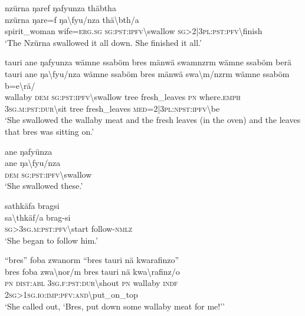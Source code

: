 \ea\label{ex:8:a1753}
nzürna ŋaref ŋafyunza thäbtha\\
\gll nzürna	ŋare=f	ŋa{\textbackslash}fyu/nza	thä{\textbackslash}bth/a\\
     spirit\_woman	wife=\textsc{erg}.\textsc{sg}	\textsc{sg}:\textsc{pst}:\textsc{ipfv}{\textbackslash}swallow	\textsc{sg}>2|3\textsc{pl}:\textsc{pst}:\textsc{pfv}{\textbackslash}finish\\
\glt `The Nzürna swallowed it all down. She finished it all.'
\z

\ea\label{ex:8:a1755}
tauri ane ŋafyunza wämne ssaböm bres mänwä swamnzrm wämne ssaböm berä\\
\gll tauri	ane	ŋa{\textbackslash}fyu/nza	wämne	ssaböm	bres	mänwä	swa{\textbackslash}m/nzrm	wämne	ssaböm	b=e{\textbackslash}rä/\\
     wallaby	\textsc{dem}	\textsc{sg}:\textsc{pst}:\textsc{ipfv}{\textbackslash}swallow	tree	fresh\_leaves	\textsc{pn}	where.\textsc{emph}	3\textsc{sg}.\textsc{m}:\textsc{pst}:\textsc{dur}{\textbackslash}sit	tree	fresh\_leaves	\textsc{med}=2|3\textsc{pl}:\textsc{npst}:\textsc{ipfv}{\textbackslash}be\\
\glt `She swallowed the wallaby meat and the fresh leaves (in the oven) and the leaves that bres was sitting on.'
\z

\ea\label{ex:8:a1756}
ane ŋafyünza\\
\gll ane	ŋa{\textbackslash}fyu/nza\\
     \textsc{dem}	\textsc{sg}:\textsc{pst}:\textsc{ipfv}{\textbackslash}swallow\\
\glt `She swallowed these.'
\z

\ea\label{ex:8:a1757}
sathkäfa bragsi\\
\gll sa{\textbackslash}thkäf/a	brag-si\\
     \textsc{sg}>3\textsc{sg}.\textsc{m}:\textsc{pst}:\textsc{pfv}{\textbackslash}start	follow-\textsc{nmlz}\\
\glt `She began to follow him.'
\z

\ea\label{ex:8:a1758}
``bres'' foba zwanorm ``bres tauri nä kwarafinzo''\\
\gll bres	foba	zwa{\textbackslash}nor/m	bres	tauri	nä	kwa{\textbackslash}rafinz/o\\
     \textsc{pn}	\textsc{dist}:\textsc{abl}	3\textsc{sg}.\textsc{f}:\textsc{pst}:\textsc{dur}{\textbackslash}shout	\textsc{pn}	wallaby	\textsc{indf}	2\textsc{sg}>1\textsc{sg}.\textsc{io}:\textsc{imp}:\textsc{pfv}:\textsc{and}{\textbackslash}put\_on\_top\\
\glt `She called out, ‘Bres, put down some wallaby meat for me!’'
\z

